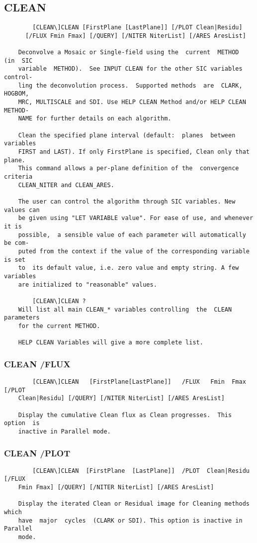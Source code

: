\subsection{CLEAN}
\begin{verbatim}
        [CLEAN\]CLEAN [FirstPlane [LastPlane]] [/PLOT Clean|Residu]
      [/FLUX Fmin Fmax] [/QUERY] [/NITER NiterList] [/ARES AresList]

    Deconvolve a Mosaic or Single-field using the  current  METHOD  (in  SIC
    variable  METHOD).  See INPUT CLEAN for the other SIC variables control-
    ling the deconvolution process.  Supported methods  are  CLARK,  HOGBOM,
    MRC, MULTISCALE and SDI. Use HELP CLEAN Method and/or HELP CLEAN METHOD-
    NAME for further details on each algorithm.

    Clean the specified plane interval (default:  planes  between  variables
    FIRST and LAST). If only FirstPlane is specified, Clean only that plane.
    This command allows a per-plane definition of the  convergence  criteria
    CLEAN_NITER and CLEAN_ARES.

    The user can control the algorithm through SIC variables. New values can
    be given using "LET VARIABLE value". For ease of use, and whenever it is
    possible,  a sensible value of each parameter will automatically be com-
    puted from the context if the value of the corresponding variable is set
    to  its default value, i.e. zero value and empty string. A few variables
    are initialized to "reasonable" values.

        [CLEAN\]CLEAN ?
    Will list all main CLEAN_* variables controlling  the  CLEAN  parameters
    for the current METHOD.

    HELP CLEAN Variables will give a more complete list.

\end{verbatim}
\subsubsection{CLEAN /FLUX}
\begin{verbatim}
        [CLEAN\]CLEAN   [FirstPlane[LastPlane]]   /FLUX   Fmin  Fmax  [/PLOT
    Clean|Residu] [/QUERY] [/NITER NiterList] [/ARES AresList]

    Display the cumulative Clean flux as Clean progresses.  This  option  is
    inactive in Parallel mode.

\end{verbatim}
\subsubsection{CLEAN /PLOT}
\begin{verbatim}
        [CLEAN\]CLEAN  [FirstPlane  [LastPlane]]  /PLOT  Clean|Residu [/FLUX
    Fmin Fmax] [/QUERY] [/NITER NiterList] [/ARES AresList]

    Display the iterated Clean or Residual image for Cleaning methods  which
    have  major  cycles  (CLARK or SDI). This option is inactive in Parallel
    mode.

\end{verbatim}
